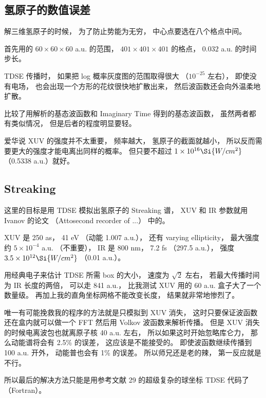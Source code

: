 
\subsection{氢原子的数值误差}
解三维氢原子的时候， 为了防止势能为无穷， 中心点要选在八个格点中间。

首先用的 $60\times 60\times 60$ a.u. 的范围， $401\times 401\times 401$ 的格点， $0.032$ a.u. 的时间步长。

TDSE 传播时， 如果把 log 概率灰度图的范围取得很大 （$10^{-25}$ 左右）， 即使没有电场， 也会出现一个方形的花纹很快地扩散出来， 然后波函数还会向外温柔地扩散。

比较了用解析的基态波函数和 Imaginary Time 得到的基态波函数， 虽然两者都有类似情况， 但是后者的程度明显要轻。

爱华说 XUV 的强度并不太重要， 频率越大， 氢原子的截面就越小， 所以反而需要更大的强度才能电离出同样的概率。 但只要不超过 $1\times 10^{16} \Si{W/cm^2}$ （0.5338 a.u.）就好。

\subsection{Streaking}
这里的目标是用 TDSE 模拟出氢原子的 Streaking 谱， XUV 和 IR 参数就用 Ivanov 的论文 （Attosecond recorder of ...） 中的。

XUV 是 250 as， 41 eV （动能 1.007 a.u.）， 还有 varying ellipticity， 最大强度约 $5\times 10^{-4}$ a.u. （不重要）， IR 是 800 nm， 7.2 fs （297.5 a.u.）， 强度 $3.5\times 10^{12} \Si{W/cm^2}$ （0.01 a.u.）。

用经典电子来估计 TDSE 所需 box 的大小， 速度为 $\sqrt{2}$ 左右， 若最大传播时间为 IR 长度的两倍， 可以走 841 a.u.， 比我测试 XUV 用的 60 a.u. 盒子大了一个数量级。 再加上我的直角坐标网格不能改变长度， 结果就非常地惨烈了。

唯一有可能挽救我的程序的方法就是只模拟到 XUV 消失， 这时只要保证波函数还在盒内就可以做一个 FFT 然后用 Volkov 波函数来解析传播。 但是 XUV 消失的时候电离波包也就离原子核 40 a.u. 左右， 所以如果这时开始忽略库仑力， 那么动能谱将会有 2.5\% 的误差， 这应该是不能接受的。 即使波函数继续传播到 100 a.u. 开外， 动能普也会有 1\% 的误差。 所以师兄还是老的辣， 第一反应就是不行。

所以最后的解决方法只能是用参考文献 29 的超级复杂的球坐标 TDSE 代码了（Fortran）。
